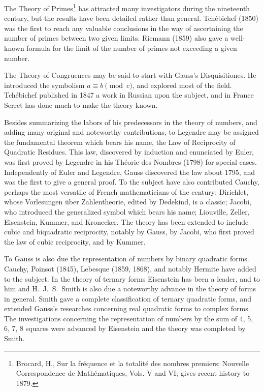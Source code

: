 \documentclass[oneside]{book}
\begin{document}
The Theory of Primes\footnote{Brocard, H., Sur la fr\'equence et la
totalit\'e des nombres premiers; Nouvelle Correspondence de
Math\'ematiques, Vols. V and VI; gives recent history to 1879.} has
attracted many investigators during the nineteenth century, but
the results have been detailed rather than general. Tch\'e\-bi\-chef
(1850)
was the first to reach any valuable conclusions in the way of
ascertaining the number of primes between two given limits. Riemann
(1859) also gave a well-known formula for the limit of the number of
primes not exceeding a given number.

The Theory of Congruences may be said to start with Gauss's
Disquisitiones. He introduced the symbolism $a \equiv b \pmod c$,
and explored most of the field. Tch\'ebichef published in
1847 a work in Russian upon the subject, and in France Serret has
done much to make the theory known.

Besides summarizing the labors of his predecessors in the theory of
numbers, and adding many original and noteworthy contributions, to
Legendre may be assigned the fundamental theorem which bears his
name, the Law of Reciprocity of Quadratic Residues. This law,
discovered by induction and enunciated by Euler, was first proved by
Legendre in his Th\'eorie des Nombres (1798) for special
cases. Independently of Euler and Legendre, Gauss discovered the law
about 1795, and was the first to give a general proof. To the
subject have also contributed Cauchy, perhaps the most versatile of
French mathematicians of the century; Dirichlet, whose Vorlesungen
\"uber Zahlentheorie, edited by Dedekind, is a classic; Jacobi,
who introduced the generalized symbol which bears his name;
Liouville, Zeller, Eisenstein, Kummer, and Kronecker. The theory has
been extended to include cubic and biquadratic reciprocity, notably
by Gauss, by Jacobi, who first proved the law of cubic reciprocity,
and by Kummer.

To Gauss is also due the representation of numbers by binary
quadratic forms. Cauchy, Poinsot (1845), Lebesque (1859, 1868), and
notably Hermite have added to the subject. In the theory of ternary
forms Eisenstein has been a leader, and to him and H.~J.~S.~Smith is
also due a noteworthy advance in the theory of forms in
general. Smith gave a complete classification of ternary quadratic
forms, and extended Gauss's researches concerning real quadratic
forms to complex forms. The investigations concerning the
representation of numbers by the sum of 4, 5, 6, 7, 8 squares were
advanced by Eisenstein and the theory was completed by Smith.
\end{document}
